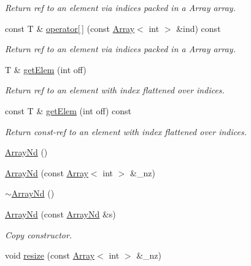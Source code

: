 \begin{DoxyCompactItemize}
\begin{DoxyCompactList}\small\item\em Return ref to an element via indices packed in a Array array. \end{DoxyCompactList}\item 
const T \& \mbox{\hyperlink{classADAT_1_1ArrayNd_a3b7160cbd3939f68f4a23df8cc56d2df}{operator\mbox{[}$\,$\mbox{]}}} (const \mbox{\hyperlink{classXMLArray_1_1Array}{Array}}$<$ int $>$ \&ind) const
\begin{DoxyCompactList}\small\item\em Return ref to an element via indices packed in a Array array. \end{DoxyCompactList}\item 
T \& \mbox{\hyperlink{classADAT_1_1ArrayNd_abc5c56420a9625b236d4521acb083de2}{get\+Elem}} (int off)
\begin{DoxyCompactList}\small\item\em Return ref to an element with index flattened over indices. \end{DoxyCompactList}\item 
const T \& \mbox{\hyperlink{classADAT_1_1ArrayNd_a515368f71387996ee237309eb1f0cc2e}{get\+Elem}} (int off) const
\begin{DoxyCompactList}\small\item\em Return const-\/ref to an element with index flattened over indices. \end{DoxyCompactList}\item 
\mbox{\hyperlink{classADAT_1_1ArrayNd_aafdf6b588aa54b3d59b6952971bcdce4}{Array\+Nd}} ()
\item 
\mbox{\hyperlink{classADAT_1_1ArrayNd_aea668cd9a67b06d552e4acb9a7dec98c}{Array\+Nd}} (const \mbox{\hyperlink{classXMLArray_1_1Array}{Array}}$<$ int $>$ \&\+\_\+nz)
\item 
\mbox{\hyperlink{classADAT_1_1ArrayNd_a040990cb205b2c2b5eb2f5d0594408b9}{$\sim$\+Array\+Nd}} ()
\item 
\mbox{\hyperlink{classADAT_1_1ArrayNd_a8aec6c75f499b938b8702d4eab1699b8}{Array\+Nd}} (const \mbox{\hyperlink{classADAT_1_1ArrayNd}{Array\+Nd}} \&s)
\begin{DoxyCompactList}\small\item\em Copy constructor. \end{DoxyCompactList}\item 
void \mbox{\hyperlink{classADAT_1_1ArrayNd_afcf13cf80c4cb861316d1ad55601818e}{resize}} (const \mbox{\hyperlink{classXMLArray_1_1Array}{Array}}$<$ int $>$ \&\+\_\+nz)

\end{DoxyCompactItemize}
